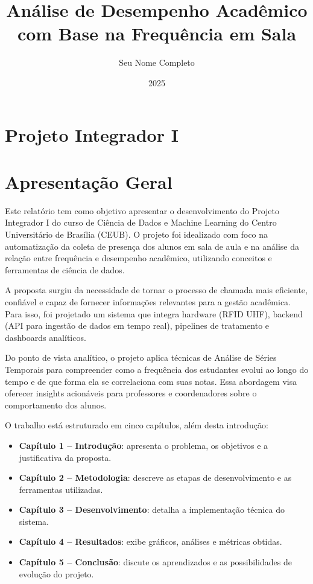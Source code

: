 \documentclass[
  letterpaper,
]{article}
\title{Análise de Desempenho Acadêmico com Base na Frequência em Sala}
\author{Seu Nome Completo}
\date{2025}
\providecommand{\tightlist}{%
  \setlength{\itemsep}{0pt}\setlength{\parskip}{0pt}}
\renewcommand*\contentsname{Table of contents}
\newcommand\contentsname{Table of contents}
\begin{document}
\maketitle

\renewcommand*\contentsname{Table of contents}
{
\hypersetup{linkcolor=}
\setcounter{tocdepth}{2}
\tableofcontents
}


\chapter{Projeto Integrador I}\label{projeto-integrador-i}


\chapter{Apresentação Geral}\label{apresentauxe7uxe3o-geral}

Este relatório tem como objetivo apresentar o desenvolvimento do Projeto
Integrador I do curso de Ciência de Dados e Machine Learning do Centro
Universitário de Brasília (CEUB). O projeto foi idealizado com foco na
automatização da coleta de presença dos alunos em sala de aula e na
análise da relação entre frequência e desempenho acadêmico, utilizando
conceitos e ferramentas de ciência de dados.

A proposta surgiu da necessidade de tornar o processo de chamada mais
eficiente, confiável e capaz de fornecer informações relevantes para a
gestão acadêmica. Para isso, foi projetado um sistema que integra
hardware (RFID UHF), backend (API para ingestão de dados em tempo real),
pipelines de tratamento e dashboards analíticos.

Do ponto de vista analítico, o projeto aplica técnicas de Análise de
Séries Temporais para compreender como a frequência dos estudantes
evolui ao longo do tempo e de que forma ela se correlaciona com suas
notas. Essa abordagem visa oferecer insights acionáveis para professores
e coordenadores sobre o comportamento dos alunos.

O trabalho está estruturado em cinco capítulos, além desta introdução:

\begin{itemize}
\tightlist
\item
  \textbf{Capítulo 1 -- Introdução}: apresenta o problema, os objetivos
  e a justificativa da proposta.
\item
  \textbf{Capítulo 2 -- Metodologia}: descreve as etapas de
  desenvolvimento e as ferramentas utilizadas.
\item
  \textbf{Capítulo 3 -- Desenvolvimento}: detalha a implementação
  técnica do sistema.
\item
  \textbf{Capítulo 4 -- Resultados}: exibe gráficos, análises e métricas
  obtidas.
\item
  \textbf{Capítulo 5 -- Conclusão}: discute os aprendizados e as
  possibilidades de evolução do projeto.
\end{itemize}
\end{document}
